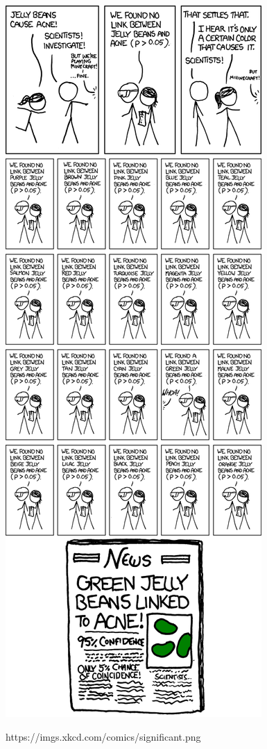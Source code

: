 \documentclass[slidestop,compress,mathserif]{beamer}
\begin{document}

\begin{frame}
\begin{center}
\includegraphics[height=0.95\textheight]{xkcd_significance.png}
\end{center}

\footnotesize https://imgs.xkcd.com/comics/significant.png
\end{frame}
\end{document}
